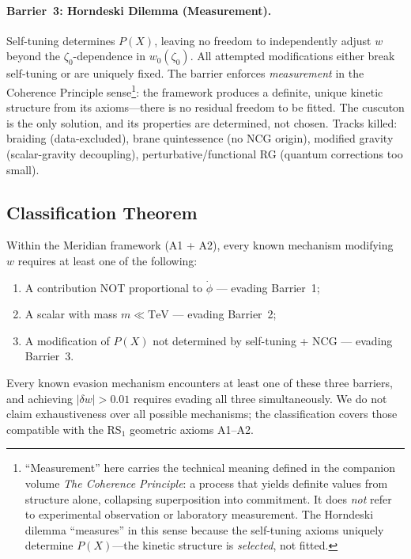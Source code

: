 \paragraph{Barrier~3: Horndeski Dilemma (Measurement).} Self-tuning determines $P(X)$, leaving no freedom to independently adjust $w$ beyond the $\zeta_0$-dependence in $w_0(\zeta_0)$. All attempted modifications either break self-tuning or are uniquely fixed. The barrier enforces \emph{measurement} in the Coherence Principle sense\footnote{``Measurement'' here carries the technical meaning defined in the companion volume \textit{The Coherence Principle}: a process that yields definite values from structure alone, collapsing superposition into commitment.  It does \emph{not} refer to experimental observation or laboratory measurement.  The Horndeski dilemma ``measures'' in this sense because the self-tuning axioms uniquely determine $P(X)$---the kinetic structure is \emph{selected}, not fitted.}: the framework produces a definite, unique kinetic structure from its axioms---there is no residual freedom to be fitted. The cuscuton is the only solution, and its properties are determined, not chosen. Tracks killed: braiding (data-excluded), brane quintessence (no NCG origin), modified gravity (scalar-gravity decoupling), perturbative/functional RG (quantum corrections too small).

\subsection{Classification Theorem}
\label{sec:3-classthm}

\begin{conjecture}
\label{thm:classification}
Within the Meridian framework (A1 + A2), every known mechanism modifying $w$ requires at least one of the following:
\begin{enumerate}
  \item[\emph{(a)}] A contribution NOT proportional to $\dot{\phi}$ --- evading Barrier~1;
  \item[\emph{(b)}] A scalar with mass $m \ll \mathrm{TeV}$ --- evading Barrier~2;
  \item[\emph{(c)}] A modification of $P(X)$ not determined by self-tuning + NCG --- evading Barrier~3.
\end{enumerate}
Every known evasion mechanism encounters at least one of these three barriers, and achieving $|\delta w| > 0.01$ requires evading all three simultaneously. We do not claim exhaustiveness over all possible mechanisms; the classification covers those compatible with the RS$_1$ geometric axioms A1--A2.
\end{conjecture}

